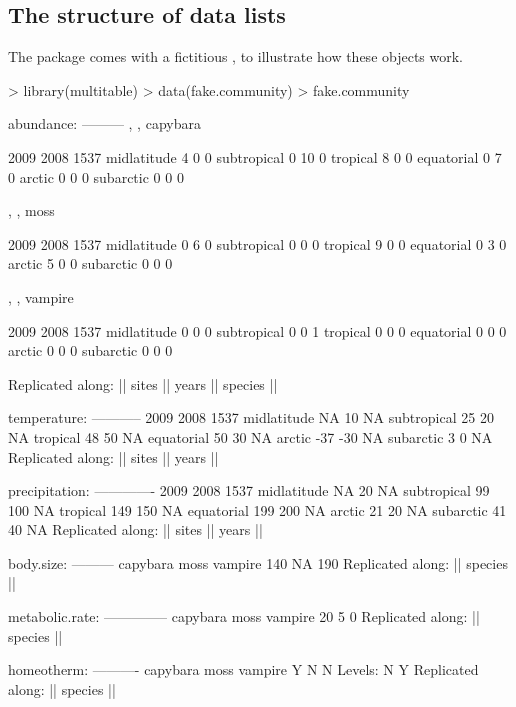 \documentclass[a4paper]{report}
\numberwithin{exercise}{section}
\begin{document}
\begin{article}
\section{The structure of data lists}

The  package comes with a fictitious , to illustrate how these objects work. %
\begin{Schunk}
\begin{Sinput}
> library(multitable)
> data(fake.community)
> fake.community
\end{Sinput}
\begin{Soutput}
abundance:
---------
, , capybara

            2009 2008 1537
midlatitude    4    0    0
subtropical    0   10    0
tropical       8    0    0
equatorial     0    7    0
arctic         0    0    0
subarctic      0    0    0

, , moss

            2009 2008 1537
midlatitude    0    6    0
subtropical    0    0    0
tropical       9    0    0
equatorial     0    3    0
arctic         5    0    0
subarctic      0    0    0

, , vampire

            2009 2008 1537
midlatitude    0    0    0
subtropical    0    0    1
tropical       0    0    0
equatorial     0    0    0
arctic         0    0    0
subarctic      0    0    0

Replicated along:  || sites || years || species || 


temperature:
-----------
            2009 2008 1537
midlatitude   NA   10   NA
subtropical   25   20   NA
tropical      48   50   NA
equatorial    50   30   NA
arctic       -37  -30   NA
subarctic      3    0   NA
Replicated along:  || sites || years || 


precipitation:
-------------
            2009 2008 1537
midlatitude   NA   20   NA
subtropical   99  100   NA
tropical     149  150   NA
equatorial   199  200   NA
arctic        21   20   NA
subarctic     41   40   NA
Replicated along:  || sites || years || 


body.size:
---------
capybara     moss  vampire 
     140       NA      190 
Replicated along:  || species || 


metabolic.rate:
--------------
capybara     moss  vampire 
      20        5        0 
Replicated along:  || species || 


homeotherm:
----------
capybara     moss  vampire 
       Y        N        N 
Levels: N Y
Replicated along:  || species || 



\end{Soutput}
\end{Schunk}
\end{article}
\end{document}
